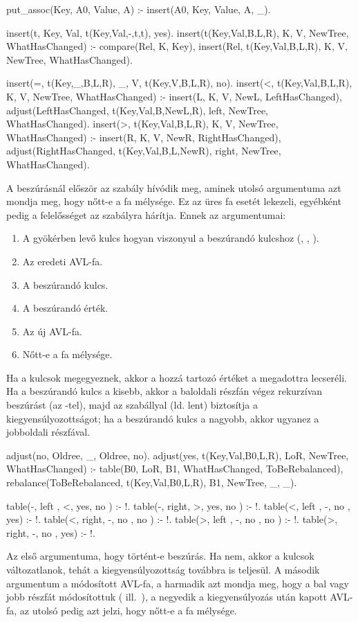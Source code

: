 \begin{program*}
put_assoc(Key, A0, Value, A) :-
    insert(A0, Key, Value, A, _).

insert(t, Key, Val, t(Key,Val,-,t,t), yes).
insert(t(Key,Val,B,L,R), K, V,
       NewTree, WhatHasChanged) :-
    compare(Rel, K, Key),
    insert(Rel, t(Key,Val,B,L,R), K, V,
           NewTree, WhatHasChanged).

insert(=, t(Key,_,B,L,R), _, V, t(Key,V,B,L,R), no).
insert(<, t(Key,Val,B,L,R), K, V,
       NewTree, WhatHasChanged) :-
    insert(L, K, V, NewL, LeftHasChanged),
    adjust(LeftHasChanged, t(Key,Val,B,NewL,R),
           left, NewTree, WhatHasChanged).
insert(>, t(Key,Val,B,L,R), K, V,
       NewTree, WhatHasChanged) :-
    insert(R, K, V, NewR, RightHasChanged),
    adjust(RightHasChanged, t(Key,Val,B,L,NewR),
           right, NewTree, WhatHasChanged).
\end{program*}
A beszúrásnál először az  szabály
hívódik meg, aminek utolsó argumentuma azt mondja
meg, hogy nőtt-e a fa mélysége. Ez az üres fa esetét
lekezeli, egyébként pedig a felelősséget az
 szabályra hárítja. Ennek az
argumentumai:
\begin{enumerate}
\item A gyökérben levő kulcs hogyan viszonyul a
  beszúrandó kulcshoz (\pr{<}, \pr{=}, \pr{>}).
\item Az eredeti AVL-fa.
\item A beszúrandó kulcs.
\item A beszúrandó érték.
\item Az új AVL-fa.
\item Nőtt-e a fa mélysége.
\end{enumerate}

Ha a kulcsok megegyeznek, akkor a hozzá tartozó
értéket a megadottra lecseréli. Ha a beszúrandó
kulcs a kisebb, akkor a baloldali részfán végez
rekurzívan beszúrást (az -tel), majd az
 szabállyal (ld. lent) biztosítja a
kiegyensúlyozottságot; ha a beszúrandó kulcs a
nagyobb, akkor ugyanez a jobboldali részfával.

\begin{program*}
adjust(no, Oldree, _, Oldree, no).
adjust(yes, t(Key,Val,B0,L,R), LoR,
       NewTree, WhatHasChanged) :-
    table(B0, LoR, B1,
          WhatHasChanged, ToBeRebalanced),
    rebalance(ToBeRebalanced, t(Key,Val,B0,L,R), B1,
              NewTree, _, _).

table(-, left , <, yes, no ) :- !.
table(-, right, >, yes, no ) :- !.
table(<, left , -, no , yes) :- !.
table(<, right, -, no , no ) :- !.
table(>, left , -, no , no ) :- !.
table(>, right, -, no , yes) :- !.
\end{program*}
Az  első argumentuma, hogy történt-e
beszúrás. Ha nem, akkor a kulcsok változatlanok,
tehát a kiegyensúlyozottság továbbra is teljesül. A
második argumentum a módosított AVL-fa, a harmadik
azt mondja meg, hogy a bal vagy jobb részfát
módosítottuk ( ill.~), a negyedik
a kiegyensúlyozás után kapott AVL-fa, az utolsó
pedig azt jelzi, hogy nőtt-e a fa mélysége.


